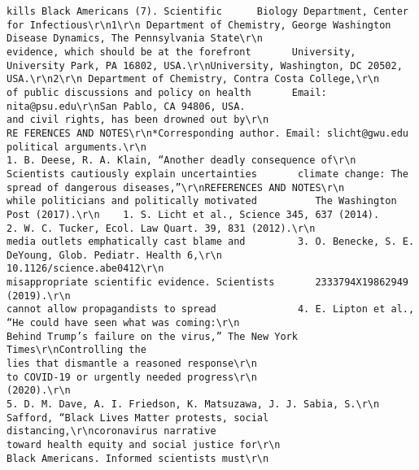 \documentclass[
]{book}
\begin{document}
\begin{verbatim}
kills Black Americans (7). Scientific      Biology Department, Center for Infectious\r\n1\r\n Department of Chemistry, George Washington                                                                  Disease Dynamics, The Pennsylvania State\r\n                                                            evidence, which should be at the forefront       University, University Park, PA 16802, USA.\r\nUniversity, Washington, DC 20502, USA.\r\n2\r\n Department of Chemistry, Contra Costa College,\r\n                                                            of public discussions and policy on health       Email: nita@psu.edu\r\nSan Pablo, CA 94806, USA.                                   and civil rights, has been drowned out by\r\n                                                                                                             RE FERENCES AND NOTES\r\n*Corresponding author. Email: slicht@gwu.edu                political arguments.\r\n                                                                                                              1. B. Deese, R. A. Klain, “Another deadly consequence of\r\n                                                               Scientists cautiously explain uncertainties       climate change: The spread of dangerous diseases,”\r\nREFERENCES AND NOTES\r\n                                                            while politicians and politically motivated          The Washington Post (2017).\r\n    1. S. Licht et al., Science 345, 637 (2014).                                                              2. W. C. Tucker, Ecol. Law Quart. 39, 831 (2012).\r\n                                                            media outlets emphatically cast blame and         3. O. Benecke, S. E. DeYoung, Glob. Pediatr. Health 6,\r\n                                  10.1126/science.abe0412\r\n                                                            misappropriate scientific evidence. Scientists       2333794X19862949 (2019).\r\n                                                            cannot allow propagandists to spread              4. E. Lipton et al., “He could have seen what was coming:\r\n                                                                                                                 Behind Trump’s failure on the virus,” The New York Times\r\nControlling the                                             lies that dismantle a reasoned response\r\n                                                            to COVID-19 or urgently needed progress\r\n                                                                                                                 (2020).\r\n                                                                                                              5. D. M. Dave, A. I. Friedson, K. Matsuzawa, J. J. Sabia, S.\r\n                                                                                                                 Safford, “Black Lives Matter protests, social distancing,\r\ncoronavirus narrative                                       toward health equity and social justice for\r\n                                                            Black Americans. Informed scientists must\r\n                                                                                            
\end{verbatim}
\end{document}
